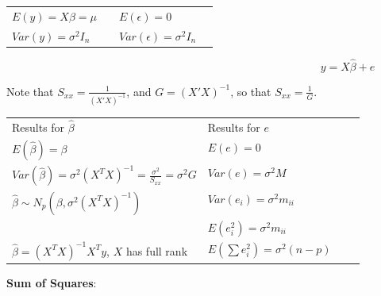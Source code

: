 \begin{tabular}{@{}ll@{}ll@{}}
$E(y) = X\beta = \mu$ &  & $E(\epsilon)=0$  \\
$Var(y) = \sigma^2 I_n $ & & $Var(\epsilon) = \sigma^2 I_n$ \\
\end{tabular}

\begin{equation}
y = X\hat{\beta} + e
\end{equation}

\begin{fmpage}{\linewidth}
Note that $S_{xx}=\frac{1}{(X'X)^{-1}}$, and 
$G=(X'X)^{-1}$, so that $S_{xx}=\frac{1}{G}$.
\end{fmpage}

\begin{tabular}{@{}ll@{}ll@{}}
Results for $\hat{\beta}$ & Results for $e$\\
$E(\hat{\beta}) = \beta$ & $E(e) = 0$\\
$Var(\hat{\beta}) = \sigma^2 (X^T X)^{-1} = \frac{\sigma^2}{S_{xx}}=\sigma^2G$ & $Var(e)=\sigma^2 M$  \\
$\hat{\beta} \sim N_p(\beta,\sigma^2 (X^T X)^{-1})$ & $Var(e_i)=\sigma^2 m_{ii} $\\ 
&  $E(e_i^2)= \sigma^2 m_{ii}$\\
$\hat{\beta} = (X^T X)^{-1} X^T y$, $X$ has full rank  & $E(\sum e_i^2) = \sigma^2 (n-p)$\\
\end{tabular}

\medskip
\textbf{Sum of Squares}:

